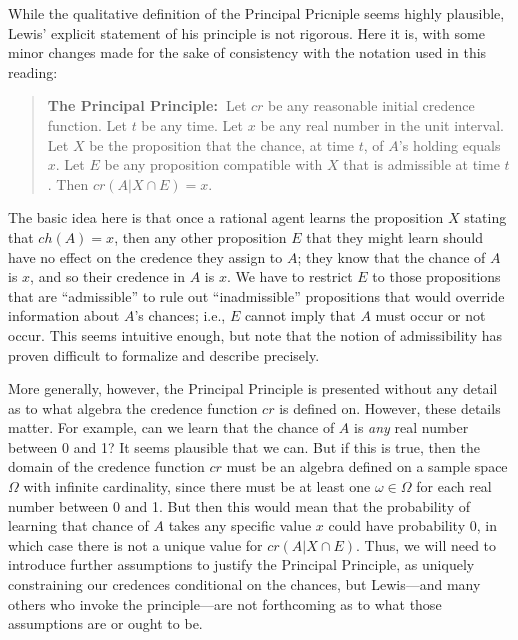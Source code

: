 \documentclass[11pt]{article}
\theoremstyle{definition}
\theoremstyle{remark}
\begin{document}
While the qualitative definition of the Principal Pricniple seems highly plausible, Lewis' explicit statement of his principle is not rigorous. Here it is, with some minor changes made for the sake of consistency with the notation used in this reading:
\begin{quote}
    \textbf{The Principal Principle:\ }Let $cr$ be any reasonable initial credence function. Let $t$ be any time. Let $x$ be any real number in the unit interval. Let $X$ be the proposition that the chance, at time $t$, of $A$'s holding equals $x$. Let $E$ be any proposition compatible with $X$ that is admissible at time $t$. Then $cr(A|X\cap E)=x$. 
\end{quote}
The basic idea here is that once a rational agent learns the proposition $X$ stating that $ch(A)=x$, then any other proposition $E$ that they might learn should have no effect on the credence they assign to $A$; they know that the chance of $A$ is $x$, and so their credence in $A$ is $x$. We have to restrict $E$ to those propositions that are ``admissible'' to rule out ``inadmissible'' propositions that would override information about $A$'s chances; i.e., $E$ cannot imply that $A$ must occur or not occur. This seems intuitive enough, but note that the notion of admissibility has proven difficult to formalize and describe precisely.\par 

More generally, however, the Principal Principle is presented without any detail as to what algebra the credence function $cr$ is defined on. However, these details matter. For example, can we learn that the chance of $A$ is \textit{any} real number between 0 and 1? It seems plausible that we can. But if this is true, then the domain of the credence function $cr$ must be an algebra defined on a sample space $\Omega$ with infinite cardinality, since there must be at least one $\omega\in\Omega$ for each real number between 0 and 1. But then this would mean that the probability of learning that chance of $A$ takes any specific value $x$ could have probability $0$, in which case there is not a unique value for $cr(A|X\cap E)$. Thus, we will need to introduce further assumptions to justify the Principal Principle, as uniquely constraining our credences conditional on the chances, but Lewis---and many others who invoke the principle---are not forthcoming as to what those assumptions are or ought to be.
\end{document}

